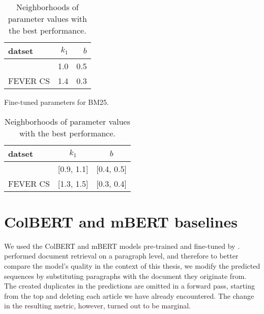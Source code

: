 \begin{table}[!htb]
    \centering
    \begin{minipage}[t]{.47\textwidth}    
        \centering
        \begin{tabular}{lrr}
            datset & $k_1$ & $b$ \\
            \midrule
            \CTK{} & 1.0 & 0.5 \\
            FEVER CS & 1.4 & 0.3
        \end{tabular}
        \caption[BM25 Fine-tuned Parameters]{Fine-tuned parameters for BM25.}
        \label{tab:bm25_finetune}
    \end{minipage}
    \hfill
    \begin{minipage}[t]{.47\textwidth}
        \centering
        \begin{tabular}{lcc}
            datset & $k_1$ & $b$ \\
            \midrule
            \CTK{} & [0.9, 1.1] & [0.4, 0.5] \\
            FEVER CS & [1.3, 1.5] & [0.3, 0.4]
        \end{tabular}
        \caption[BM25 Promising Parameter Sets]{Neighborhoods of parameter values with the best performance.}
        \label{tab:bm25_sets}
    \end{minipage}
\end{table}

\section{ColBERT and mBERT baselines}

We used the ColBERT and mBERT models pre-trained and fine-tuned by \citet{rypar}.
\citet{rypar} performed document retrieval on a paragraph level, and therefore to better compare the model's quality in the context of this thesis, we modify the predicted sequences by substituting paragraphs with the document they originate from.
The created duplicates in the predictions are omitted in a forward pass, starting from the top and deleting each article we have already encountered.
The change in the resulting metric, however, turned out to be marginal.

